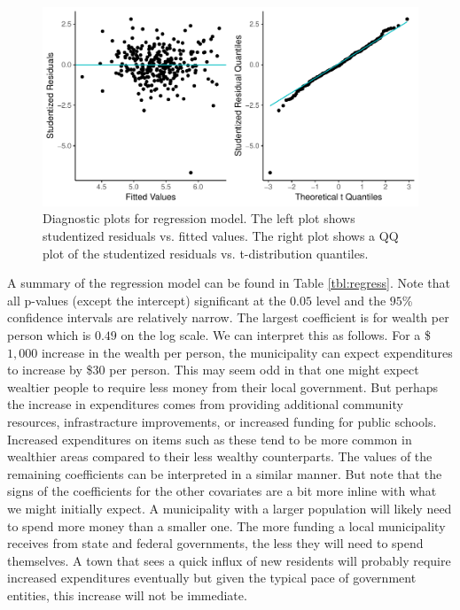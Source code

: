 \documentclass{article}\usepackage[]{graphicx}\usepackage[]{color}
\makeatletter
\def\maxwidth{ %
  \ifdim\Gin@nat@width>\linewidth
    \linewidth
  \else
    \Gin@nat@width
  \fi
}
\newenvironment{knitrout}{}{} %
\makeatother
\begin{document}
\begin{knitrout}
\color{fgcolor}\begin{figure}
\includegraphics[width=\maxwidth]{figure/r_diag_plots-1} \caption{\label{fig:diag} Diagnostic plots for regression model. The left plot shows studentized residuals vs. fitted values. The right plot shows a QQ plot of the studentized residuals vs. t-distribution quantiles.}\label{fig:r diag_plots}
\end{figure}


\end{knitrout}

A summary of the regression model can be found in Table \ref{tbl:regress}. Note that all p-values (except the intercept) significant at the $0.05$ level and the $95$\% confidence intervals are relatively narrow. The largest coefficient is for wealth per person which is $0.49$ on the log scale. We can interpret this as follows. For a \$$1,000$ increase in the wealth per person, the municipality can expect expenditures to increase by \$$30$ per person. This may seem odd in that one might expect wealtier people to require less money from their local government. But perhaps the increase in expenditures comes from providing additional community resources, infrastracture improvements, or increased funding for public schools. Increased expenditures on items such as these tend to be more common in wealthier areas compared to their less wealthy counterparts. The values of the remaining coefficients can be interpreted in a similar manner. But note that the signs of the coefficients for the other covariates are a bit more inline with what we might initially expect. A municipality with a larger population will likely need to spend more money than a smaller one. The more funding a local municipality receives from state and federal governments, the less they will need to spend themselves. A town that sees a quick influx of new residents will probably require increased expenditures eventually but given the typical pace of government entities, this increase will not be immediate.
\end{document}
